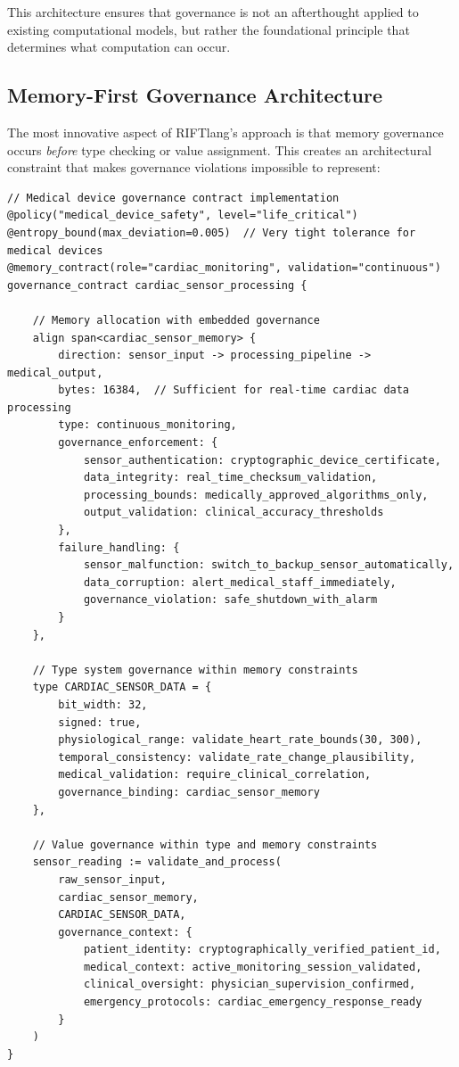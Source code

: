 This architecture ensures that governance is not an afterthought applied to existing computational models, but rather the foundational principle that determines what computation can occur.

\subsection{Memory-First Governance Architecture}

The most innovative aspect of RIFTlang's approach is that memory governance occurs \textit{before} type checking or value assignment. This creates an architectural constraint that makes governance violations impossible to represent:

\begin{lstlisting}[language=rift, caption=Memory-First Governance Implementation]
// Medical device governance contract implementation
@policy("medical_device_safety", level="life_critical")
@entropy_bound(max_deviation=0.005)  // Very tight tolerance for medical devices
@memory_contract(role="cardiac_monitoring", validation="continuous")
governance_contract cardiac_sensor_processing {
    
    // Memory allocation with embedded governance
    align span<cardiac_sensor_memory> {
        direction: sensor_input -> processing_pipeline -> medical_output,
        bytes: 16384,  // Sufficient for real-time cardiac data processing
        type: continuous_monitoring,
        governance_enforcement: {
            sensor_authentication: cryptographic_device_certificate,
            data_integrity: real_time_checksum_validation,
            processing_bounds: medically_approved_algorithms_only,
            output_validation: clinical_accuracy_thresholds
        },
        failure_handling: {
            sensor_malfunction: switch_to_backup_sensor_automatically,
            data_corruption: alert_medical_staff_immediately,
            governance_violation: safe_shutdown_with_alarm
        }
    },
    
    // Type system governance within memory constraints
    type CARDIAC_SENSOR_DATA = {
        bit_width: 32,
        signed: true,
        physiological_range: validate_heart_rate_bounds(30, 300),
        temporal_consistency: validate_rate_change_plausibility,
        medical_validation: require_clinical_correlation,
        governance_binding: cardiac_sensor_memory
    },
    
    // Value governance within type and memory constraints
    sensor_reading := validate_and_process(
        raw_sensor_input,
        cardiac_sensor_memory,
        CARDIAC_SENSOR_DATA,
        governance_context: {
            patient_identity: cryptographically_verified_patient_id,
            medical_context: active_monitoring_session_validated,
            clinical_oversight: physician_supervision_confirmed,
            emergency_protocols: cardiac_emergency_response_ready
        }
    )
}
\end{lstlisting}

